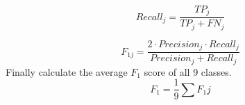 \documentclass[runningheads]{llncs}
\begin{document}
\begin{equation}
Recall_j = \frac{TP_j}{TP_j + FN_j}
\end{equation}

\begin{equation}
F_{1j} = \frac{2 \cdot Precision_j \cdot Recall_j}{Precision_j + Recall_j}
\end{equation}
Finally calculate the average $F_1$ score of all 9 classes.
\begin{equation}
F_1 = \frac{1}{9} \sum F_1j
\end{equation}
%
%
%
% 
% 
%

\end{document}
